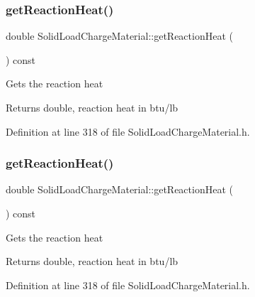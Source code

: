 \subsubsection{\texorpdfstring{get\+Reaction\+Heat()}{getReactionHeat()}\hspace{0.1cm}{\footnotesize\ttfamily [2/3]}}
{\footnotesize\ttfamily double Solid\+Load\+Charge\+Material\+::get\+Reaction\+Heat (\begin{DoxyParamCaption}{ }\end{DoxyParamCaption}) const\hspace{0.3cm}{\ttfamily [inline]}}

Gets the reaction heat \begin{DoxyReturn}{Returns}
double, reaction heat in btu/lb 
\end{DoxyReturn}


Definition at line 318 of file Solid\+Load\+Charge\+Material.\+h.

\mbox{\label{class_solid_load_charge_material_a3481dc84063babc3514a4173e6bd9341}} 
\subsubsection{\texorpdfstring{get\+Reaction\+Heat()}{getReactionHeat()}\hspace{0.1cm}{\footnotesize\ttfamily [3/3]}}
{\footnotesize\ttfamily double Solid\+Load\+Charge\+Material\+::get\+Reaction\+Heat (\begin{DoxyParamCaption}{ }\end{DoxyParamCaption}) const\hspace{0.3cm}{\ttfamily [inline]}}

Gets the reaction heat \begin{DoxyReturn}{Returns}
double, reaction heat in btu/lb 
\end{DoxyReturn}


Definition at line 318 of file Solid\+Load\+Charge\+Material.\+h.

\mbox{\label{class_solid_load_charge_material_a8b02308194b603276df3a894c401e923}} 
